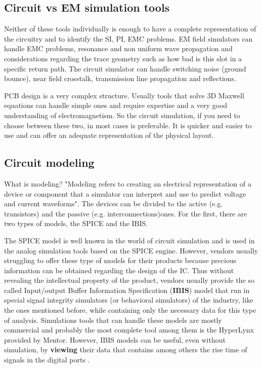 \documentclass[final]{cubedoc}
\begin{document}
	\subsection{Circuit vs EM simulation tools}
	
	Neither of these tools individually is enough to have a complete representation of the circuitry and to identify the SI, PI, EMC problems. EM field simulators can handle EMC problems, resonance and non uniform wave propagation and considerations regarding the trace geometry such as how bad is this slot in a specific return path. The circuit simulator can handle switching noise (ground bounce), near field crosstalk, transmission line propagation and reflections.	
	
	PCB design is a very complex structure. Usually tools that solve 3D Maxwell equations can handle simple ones and require expertise and a very good understanding of electromagnetism. So the circuit simulation, if you need to choose between these two, in most cases is preferable. It is quicker and easier to use and can offer an adequate representation of the physical layout.
	
	\subsection{Circuit modeling}
	
	
	What is modeling? "Modeling refers to creating an electrical representation of a device or component that a simulator can interpret and use to predict voltage and current waveforms". The devices can be divided to the active (e.g. transistors) and the passive (e.g. interconnections)ones. For the first, there are two types of models, the SPICE and the IBIS.
	
	The SPICE model is well known in the world of circuit simulation and is used in the analog simulation tools based on the SPICE engine. However, vendors usually struggling to offer these type of models for their products because precious information can be obtained regarding the design of the IC. Thus without revealing the intellectual property of the product, vendors usually provide the so called Input/output Buffer Information Specification (\textbf{IBIS}) model that run in special signal integrity simulators (or behavioral simulators) of the industry, like the ones mentioned before, while containing only the necessary data for this type of analysis. Simulations tools that can handle these models are mostly commercial and probably the most complete tool among them is the HyperLynx provided by Mentor.
	However, IBIS models can be useful, even without simulation, by \textbf{viewing} their data that contains among others the rise time of signals in the digital ports \cite{bogatin2009signal}.
	
\end{document}
